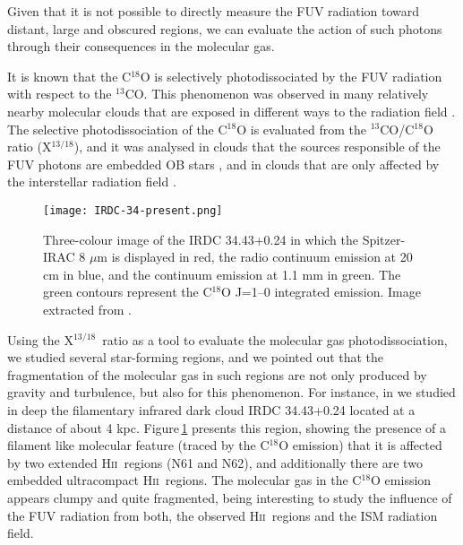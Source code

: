 \documentclass[baaa]{baaa}
\newcommand{\hii}{H\textsc{ii}}
\begin{document}
Given that it is not possible to directly measure the FUV radiation toward distant, large and obscured regions, we can evaluate the action of such photons through their consequences in the molecular gas. 

It is known that the C$^{18}$O is selectively photodissociated by the FUV radiation with respect to the $^{13}$CO. This phenomenon was observed in 
many relatively nearby molecular clouds that are exposed in different ways to the radiation field \citep{yama19,kong15,minchin95}. The selective photodissociation of the C$^{18}$O is evaluated from the $^{13}$CO/C$^{18}$O ratio (X$^{13/18}$), and it was analysed in clouds that the sources responsible of the FUV photons are embedded OB stars \citep{shima14}, and in clouds that are only affected by the interstellar radiation field \citep{lin16}.

\begin{figure}[h!]
\centering
\texttt{[image: IRDC-34-present.png]}
\caption{Three-colour image of the IRDC 34.43+0.24 in which the Spitzer-IRAC 8 $\mu$m
is displayed in red, the radio continuum emission at 20 cm in blue, and the continuum emission at 1.1 mm in green. The green contours represent the C$^{18}$O J=1--0 integrated emission. Image extracted from \citet{areal19}.}
\label{irdc34}
\end{figure}

Using the X$^{13/18}$~ratio as a tool to evaluate the molecular gas photodissociation, we studied several star-forming regions, and we pointed out that the fragmentation of the molecular gas in such regions are not only produced by gravity and turbulence, but also for this phenomenon.  For instance, in \citet{areal19} we studied in deep the filamentary infrared dark cloud IRDC 34.43+0.24 located at a distance of about 4 kpc. Figure\,\ref{irdc34} presents this region, showing the presence of a filament like molecular feature (traced by the C$^{18}$O emission) that it is affected by two extended \hii~regions (N61 and N62), and additionally there are two embedded ultracompact \hii~regions. The molecular gas in the C$^{18}$O emission appears clumpy and quite fragmented, being interesting to study the influence of the FUV radiation from both, the observed \hii~regions and the ISM radiation field. 
\end{document}
